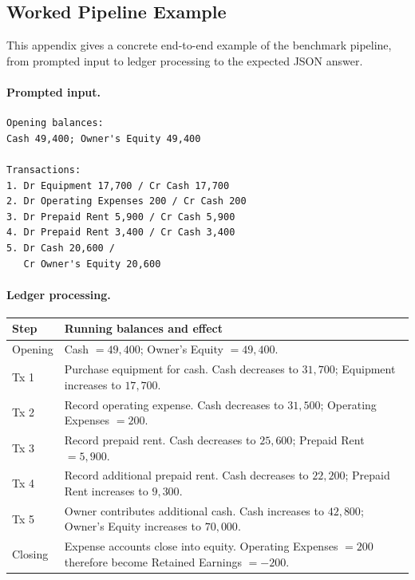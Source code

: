 \subsection{Worked Pipeline Example}
\label{app:worked-example}

This appendix gives a concrete end-to-end example of the benchmark
pipeline, from prompted input to ledger processing to the expected
JSON answer.

\paragraph{Prompted input.}
\begin{verbatim}
Opening balances:
Cash 49,400; Owner's Equity 49,400

Transactions:
1. Dr Equipment 17,700 / Cr Cash 17,700
2. Dr Operating Expenses 200 / Cr Cash 200
3. Dr Prepaid Rent 5,900 / Cr Cash 5,900
4. Dr Prepaid Rent 3,400 / Cr Cash 3,400
5. Dr Cash 20,600 /
   Cr Owner's Equity 20,600
\end{verbatim}

\paragraph{Ledger processing.}
\begin{center}
\small
\begin{tabularx}{\columnwidth}{@{}l>{\raggedright\arraybackslash}X@{}}
\toprule
Step & Running balances and effect \\
\midrule
Opening & Cash \(=49{,}400\); Owner's Equity \(=49{,}400\). \\
Tx 1 & Purchase equipment for cash. Cash decreases to \(31{,}700\); Equipment increases to \(17{,}700\). \\
Tx 2 & Record operating expense. Cash decreases to \(31{,}500\); Operating Expenses \(=200\). \\
Tx 3 & Record prepaid rent. Cash decreases to \(25{,}600\); Prepaid Rent \(=5{,}900\). \\
Tx 4 & Record additional prepaid rent. Cash decreases to \(22{,}200\); Prepaid Rent increases to \(9{,}300\). \\
Tx 5 & Owner contributes additional cash. Cash increases to \(42{,}800\); Owner's Equity increases to \(70{,}000\). \\
Closing & Expense accounts close into equity. Operating Expenses \(=200\) therefore become Retained Earnings \(=-200\). \\
\bottomrule
\end{tabularx}
\end{center}

